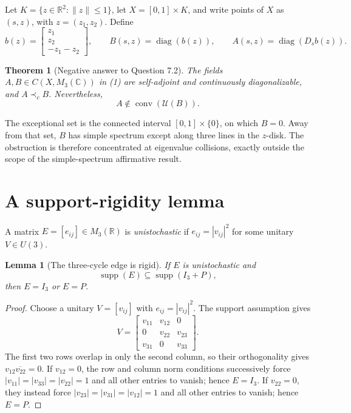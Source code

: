 \documentclass[11pt]{article}
\newtheorem{theorem}{Theorem}
\newtheorem{lemma}{Lemma}
\newcommand{\C}{\mathbb C}
\newcommand{\R}{\mathbb R}
\newcommand{\U}{\mathcal U}
\newcommand{\diag}{\operatorname{diag}}
\newcommand{\conv}{\operatorname{conv}}
\begin{document}
Let $K=\{z\in\R^2:\|z\|\leq1\}$, let $X=[0,1]\times K$, and write points
of $X$ as $(s,z)$, with $z=(z_1,z_2)$.  Define
\[
 b(z)=\begin{bmatrix}z_1\\z_2\\-z_1-z_2\end{bmatrix},\qquad
 B(s,z)=\diag(b(z)),\qquad
 A(s,z)=\diag(D_sb(z)).                                      \tag{1}
\]

\begin{theorem}[Negative answer to Question 7.2]\label{thm:main}
The fields $A,B\in C(X,M_3(\C))$ in \emph{(1)} are self-adjoint and
continuously diagonalizable, and $A\prec_cB$.  Nevertheless,
\[
                         A\notin\conv(\U(B)).
\]
\end{theorem}

The exceptional set is the connected interval
$[0,1]\times\{0\}$, on which $B=0$.  Away from that set, $B$ has simple
spectrum except along three lines in the $z$-disk.  The obstruction is
therefore concentrated at eigenvalue collisions, exactly outside the scope
of the simple-spectrum affirmative result.

\section{A support-rigidity lemma}

A matrix $E=[e_{ij}]\in M_3(\R)$ is \emph{unistochastic} if
$e_{ij}=|v_{ij}|^2$ for some unitary $V\in U(3)$.

\begin{lemma}[The three-cycle edge is rigid]\label{lem:rigid}
If $E$ is unistochastic and
\[
                       \operatorname{supp}(E)
                       \subseteq\operatorname{supp}(I_3+P),
\]
then $E=I_3$ or $E=P$.
\end{lemma}

\begin{proof}
Choose a unitary $V=[v_{ij}]$ with $e_{ij}=|v_{ij}|^2$.  The support
assumption gives
\[
 V=\begin{bmatrix}
       v_{11}&v_{12}&0\\
       0&v_{22}&v_{23}\\
       v_{31}&0&v_{33}
    \end{bmatrix}.
\]
The first two rows overlap in only the second column, so their orthogonality
gives $v_{12}\overline{v_{22}}=0$.  If $v_{12}=0$, the row and column norm
conditions successively force
$|v_{11}|=|v_{33}|=|v_{22}|=1$ and all other entries to vanish; hence
$E=I_3$.  If $v_{22}=0$, they instead force
$|v_{23}|=|v_{31}|=|v_{12}|=1$ and all other entries to vanish; hence
$E=P$.
\end{proof}
\end{document}
